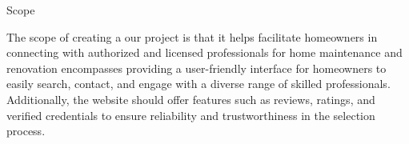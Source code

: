 \documentclass{beamer} %
\begin{document}
\begin{frame}{Scope}
    
                The scope of creating a our project is that it helps facilitate homeowners in connecting with authorized and licensed professionals for home maintenance and renovation encompasses providing a user-friendly interface for homeowners to easily search, contact, and engage with a diverse range of skilled professionals. Additionally, the website should offer features such as reviews, ratings, and verified credentials to ensure reliability and trustworthiness in the selection process.
    
    
    \vspace{10pt} %
    \begin{figure}
        \hfill
    \end{figure}
\end{frame}
%       
  


%       
  
\end{document}

